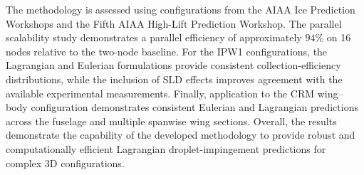 The methodology is assessed using configurations from the AIAA Ice Prediction Workshops and the Fifth AIAA High-Lift Prediction Workshop. The parallel scalability study demonstrates a parallel efficiency of approximately $94\%$ on 16 nodes relative to the two-node baseline. For the IPW1 configurations, the Lagrangian and Eulerian formulations provide consistent collection-efficiency distributions, while the inclusion of SLD effects improves agreement with the available experimental measurements. Finally, application to the CRM wing--body configuration demonstrates consistent Eulerian and Lagrangian predictions across the fuselage and multiple spanwise wing sections. Overall, the results demonstrate the capability of the developed methodology to provide robust and computationally efficient Lagrangian droplet-impingement predictions for complex 3D configurations.
